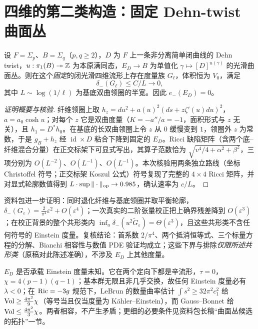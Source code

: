 \section{四维的第二类构造：固定 Dehn-twist 曲面丛}\label{sec:bundle}

\begin{theorem}\label{thm:ED}
设 $F=\Sigma_p$、$B=\Sigma_q$（$p,q\ge2$），$D$ 为 $F$ 上一条非分离简单闭曲线的 Dehn twist，$u:\pi_1(B)\twoheadrightarrow\mathbb Z$ 为本原满同态，$E_D\to B$ 为单值化 $\gamma\mapsto[D]^{u(\gamma)}$ 的光滑曲面丛。则在这个\emph{固定}的闭光滑四维流形上存在度量族 $G_\ell$，体积恒为 $V_0$，满足
\[
\delta_-(G_\ell)\le C/L\longrightarrow0,
\]
其中 $L\sim\log(1/\ell)$ 为基底双曲领圈的半宽。因此 $e_-(E_D)=0$。
\end{theorem}
\begin{proof}[证明概要与核验]
纤维领圈上取 $h_z=du^2+a(u)^2(ds+z\zeta'(u)du)^2$，$a=a_0\cosh u$；对每个 $z$ 它是双曲度量（$K=-a''/a=-1$，面积形式与 $z$ 无关），且 $h_1=D^*h_0$。在基底的长双曲领圈上令 $z$ 从 $0$ 缓慢变到 $1$，领圈外 $z$ 为常数，于是 $g_B+h_{z}$ 经 $\operatorname{id}\times D$ 粘合下降到固定的 $E_D$。Ricci 缺陷矩阵（含两个底--纤维混合分量）在正交标架下可显式写出，其算子范数恰为 $\sqrt{v^4/4+\alpha^2+\beta^2}$，三项分别为 $O(L^{-2})$、$O(L^{-1})$、$O(L^{-1})$。本次核验用两条独立路线（坐标 Christoffel 符号；正交标架 Koszul 公式）符号复现了完整的 $4\times4$ Ricci 矩阵，并对显式轮廓数值得到 $L\cdot\sup\|\cdot\|_{\mathrm{op}}\to0.985$，确认速率为 $c/L$。
\end{proof}

资料包进一步证明：同时退化纤维与基底领圈并取平衡轮廓，$\delta_-(G_\varepsilon)=\frac{2}{\pi^4}\varepsilon^2+O(\varepsilon^4)$；一次真实的二阶张量校正把上确界残差降到 $O(\varepsilon^3)$；在校正背景的整个共形类内 $\inf_u\delta_-(u^2\widetilde G_\varepsilon)=\Theta(\varepsilon^3)$，且这些共形类不含任何符号的 Einstein 度量。复核结论：首系数 $2/\pi^4$、两个抵消恒等式、三个标量方程的分解、Bianchi 相容性与数值 PDE 验证均成立；这些下界与排除\emph{仅限所述共形类}（原稿对此陈述准确），不涉及 $E_D$ 上其他度量。

\begin{remark}
$E_D$ 是否承载 Einstein 度量未知。它在两个定向下都是辛流形，$\tau=0$，$\chi=4(p-1)(q-1)$；基本群无限且非几乎交换，故任何 Einstein 度量必有 $\lambda<0$；在 $\operatorname{Ric}=-3g$ 规范下，LeBrun 的数量曲率估计 $\int s^2\ge32\pi^2c_1^2$ 给 $\operatorname{Vol}\ge\frac{4\pi^2}{9}\chi$（等号当且仅当度量为 Kähler--Einstein），而 Gauss--Bonnet 给 $\operatorname{Vol}\le\frac{4\pi^2}{3}\chi$。两者相容，不产生矛盾；更细的必要条件见资料包长稿“曲面丛候选的拓扑”一节。
\end{remark}

